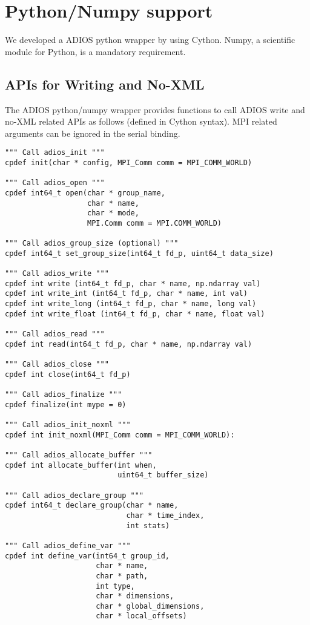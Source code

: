 \section{Python/Numpy support}
\label{section-bindings-numpy}
We developed a ADIOS python wrapper by using Cython. Numpy, a scientific module for Python, is a mandatory requirement. 

\subsection{APIs for Writing and No-XML}
The ADIOS python/numpy wrapper provides functions to call ADIOS write and no-XML related APIs as follows (defined in Cython syntax). MPI related arguments can be ignored in the serial binding.
\begin{lstlisting}[language=cython,caption={Functions for writing and No-XML},label={},]
""" Call adios_init """
cpdef init(char * config, MPI_Comm comm = MPI_COMM_WORLD)

""" Call adios_open """
cpdef int64_t open(char * group_name,
                   char * name,
                   char * mode,
                   MPI.Comm comm = MPI.COMM_WORLD)

""" Call adios_group_size (optional) """
cpdef int64_t set_group_size(int64_t fd_p, uint64_t data_size)

""" Call adios_write """
cpdef int write (int64_t fd_p, char * name, np.ndarray val)
cpdef int write_int (int64_t fd_p, char * name, int val)
cpdef int write_long (int64_t fd_p, char * name, long val)
cpdef int write_float (int64_t fd_p, char * name, float val)

""" Call adios_read """
cpdef int read(int64_t fd_p, char * name, np.ndarray val)

""" Call adios_close """
cpdef int close(int64_t fd_p)

""" Call adios_finalize """
cpdef finalize(int mype = 0)

""" Call adios_init_noxml """
cpdef int init_noxml(MPI_Comm comm = MPI_COMM_WORLD):

""" Call adios_allocate_buffer """
cpdef int allocate_buffer(int when,
                          uint64_t buffer_size)

""" Call adios_declare_group """
cpdef int64_t declare_group(char * name,
                            char * time_index,
                            int stats)

""" Call adios_define_var """
cpdef int define_var(int64_t group_id,
                     char * name,
                     char * path,
                     int type,
                     char * dimensions,
                     char * global_dimensions,
                     char * local_offsets)


\end{lstlisting}
